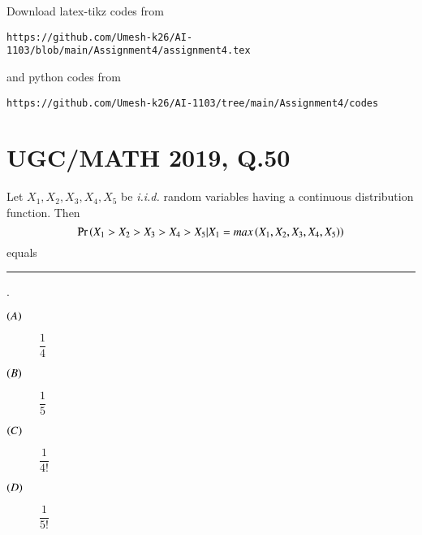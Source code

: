 \documentclass[journal,12pt,twocolumn]{IEEEtran}
\begin{document}
Download latex-tikz codes from 
%
\begin{lstlisting}
https://github.com/Umesh-k26/AI-1103/blob/main/Assignment4/assignment4.tex
\end{lstlisting}
and python codes from 
\begin{lstlisting}
https://github.com/Umesh-k26/AI-1103/tree/main/Assignment4/codes
\end{lstlisting}
\section*{UGC/MATH 2019, Q.50}
\question Let $X_1, X_2, X_3, X_4, X_5$ be \textit{i.i.d.} random variables having a continuous distribution function. 
Then 
\begin{equation*}
    \Pr\left(X_1 > X_2 > X_3 > X_4 > X_5 | X_1 = max\left(X_1, X_2, X_3, X_4, X_5\right)\right)
\end{equation*}
equals \rule{1cm}{0.2mm}.

\begin{description}
\item[$\left(A\right)$]$\dfrac{1}{4}$ \\
\item[$\left(B\right)$]$\dfrac{1}{5}$  \\
\item[$\left(C\right)$]$\dfrac{1}{4!}$  \\
\item[$\left(D\right)$]$\dfrac{1}{5!}$  \\
\end{description}
\end{document}
